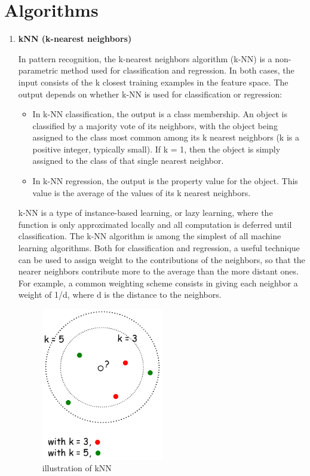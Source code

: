 \documentclass{article}
\begin{document}
\section{Algorithms}
\begin{enumerate}
	\large \item \textbf{kNN (k-nearest neighbors)}
	\normalsize
	\par In pattern recognition, the k-nearest neighbors algorithm (k-NN) is a non-parametric method used for classification and regression. In both cases, the input consists of the k closest training examples in the feature space. The output depends on whether k-NN is used for classification or regression: 
	\begin{itemize} 
		\item In k-NN classification, the output is a class membership. An object is classified by a majority vote of its neighbors, with the object being assigned to the class most common among its k nearest neighbors (k is a positive integer, typically small). If k = 1, then the object is simply assigned to the class of that single nearest neighbor.
		\item In k-NN regression, the output is the property value for the object. This value is the average of the values of its k nearest neighbors.
	\end{itemize}
	\par k-NN is a type of instance-based learning, or lazy learning, where the function is only approximated locally and all computation is deferred until classification. The k-NN algorithm is among the simplest of all machine learning algorithms. Both for classification and regression, a useful technique can be used to assign weight to the contributions of the neighbors, so that the nearer neighbors contribute more to the average than the more distant ones. For example, a common weighting scheme consists in giving each neighbor a weight of 1/d, where d is the distance to the neighbors.
	
	\begin{figure}[h]
		\centering
		\includegraphics[width=200px]{knn.png}
		\caption{illustration of kNN}
	\end{figure}


\end{enumerate}
\end{document}
